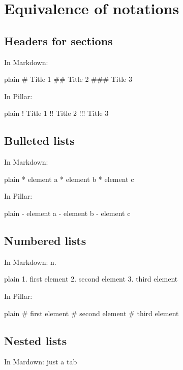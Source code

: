 \documentclass[10pt,twoside,english]{_support/latex/sbabook/sbabook}
\begin{document}
\frontmatter
\pagestyle{plain}

\tableofcontents*
\clearpage\listoffigures

\mainmatter

\chapter{Equivalence of notations}\section{Headers for sections}
In Markdown: \textcode{\#}

\begin{displaycode}{plain}
 # Title 1
## Title 2
### Title 3
\end{displaycode}

In Pillar: \textcode{!}

\begin{displaycode}{plain}
! Title 1
!! Title 2
!!! Title 3
\end{displaycode}
\section{Bulleted lists}
In Markdown: \textcode{*}

\begin{displaycode}{plain}
* element a
* element b
* element c
\end{displaycode}

In Pillar: \textcode{-}

\begin{displaycode}{plain}
- element a
- element b
- element c
\end{displaycode}
\section{Numbered lists}
In Markdown: n.

\begin{displaycode}{plain}
1. first element
2. second element
3. third element
\end{displaycode}

In Pillar: \textcode{\#}

\begin{displaycode}{plain}
# first element
# second element
# third element
\end{displaycode}
\section{Nested lists}
In Mardown: just a tab
\end{document}
